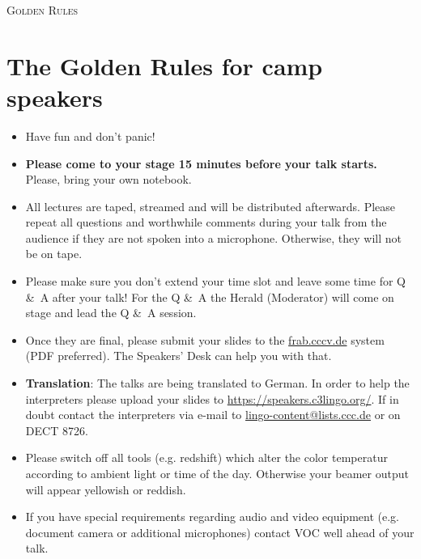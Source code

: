 \documentclass[paper=a4]{scrartcl}
\begin{document}
	\begin{center} \textsc{\Huge Golden Rules}\end{center}
	\hfill
	\section*{The Golden Rules for camp speakers}
	\begin{itemize}
		\item Have fun and don't panic!
		\item \textbf{Please come to your stage 15 minutes before your talk starts.} Please, bring your own notebook.
		\item All lectures are taped, streamed and will be distributed afterwards. Please repeat all questions and worthwhile comments during your talk from the audience if they are not spoken into a microphone. Otherwise, they will not be on tape.
		\item Please make sure you don't extend your time slot and
		leave some time for Q \&\ A after your talk! For the Q \&\ A  the Herald (Moderator) will come on stage and lead the Q \&\ A session. 
		\item Once they are final, please submit your slides to the \url{frab.cccv.de} system (PDF preferred). The Speakers' Desk can help you with that.
		\item \textbf{Translation}: The talks are being translated to German. In order to help the interpreters please upload your slides to \url{https://speakers.c3lingo.org/}. If in doubt contact the interpreters via e-mail  to \url{lingo-content@lists.ccc.de} or on DECT 8726.
		\item Please switch off all tools (e.g. redshift) which alter the color temperatur according to ambient light or time of the day. Otherwise your beamer output will appear yellowish or reddish.
		\item If you have special requirements regarding audio and video equipment (e.g. document camera or additional microphones) contact VOC well ahead of your talk.
	\end{itemize}
\end{document}
